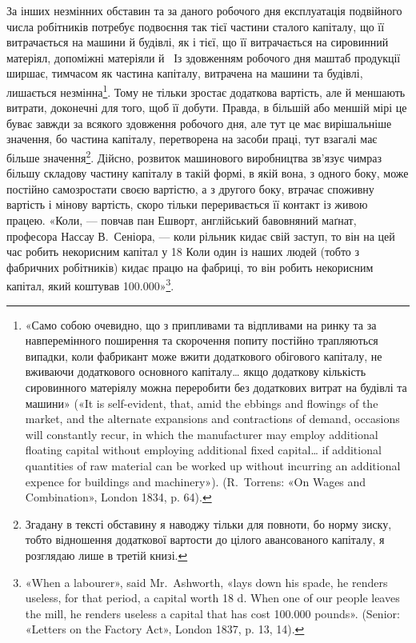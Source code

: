 За інших незмінних обставин та за даного робочого дня експлуатація
подвійного числа робітників потребує подвоєння так
тієї частини сталого капіталу, що її витрачається на машини й
будівлі, як і тієї, що її витрачається на сировинний матеріял,
допоміжні матеріяли й~ Із здовженням робочого дня маштаб
продукції ширшає, тимчасом як частина капіталу, витрачена
на машини та будівлі, лишається незмінна\footnote{
«Само собою очевидно, що з припливами та відпливами на ринку
та за навперемінного поширення та скорочення попиту постійно трапляються випадки, коли фабрикант може вжити додаткового обігового капіталу,
не вживаючи додаткового основного капіталу\dots{} якщо додаткову
кількість сировинного матеріялу можна переробити без додаткових витрат
на будівлі та машини» («It is self-evident, that, amid the ebbings and
flowings of the market, and the alternate expansions and contractions of
demand, occasions will constantly recur, in which the manufacturer may
employ additional floating capital without employing additional fixed
capital\dots{} if additional quantities of raw material can be worked up without
incurring an additional expence for buildings and machinery»).
(R.~Torrens: «On Wages and Combination», London 1834, p. 64).
}. Тому не тільки
зростає додаткова вартість, але й меншають витрати, доконечні
для того, щоб її добути. Правда, в більшій або меншій мірі це
буває завжди за всякого здовження робочого дня, але тут це
має вирішальніше значення, бо частина капіталу, перетворена
на засоби праці, тут взагалі має більше значення\footnote{
Згадану в тексті обставину я наводжу тільки для повноти, бо
норму зиску, тобто відношення додаткової вартости до цілого авансованого
капіталу, я розглядаю лише в третій книзі.
}. Дійсно,
розвиток машинового виробництва зв’язує чимраз більшу складову
частину капіталу в такій формі, в якій вона, з одного боку, може
постійно самозростати своєю вартістю, а з другого боку, втрачає
споживну вартість і мінову вартість, скоро тільки переривається
її контакт із живою працею. «Коли, — повчав пан Ешворт,
англійський бавовняний маґнат, професора Нассау В.~Сеніора, —
коли рільник кидає свій заступ, то він на цей час робить некорисним
капітал у 18 Коли один із наших людей (тобто
з фабричних робітників) кидає працю на фабриці, то він робить
некорисним капітал, який коштував \num{100.000}»\footnote{
«When a labourer», said Mr.~Ashworth, «lays down his spade, he
renders useless, for that period, a capital worth 18 d. When one of our people
leaves the mill, he renders useless a capital that has cost \num{100.000} pounds».
(Senior: «Letters on the Factory Act», London 1837, p. 13, 14).
}.
